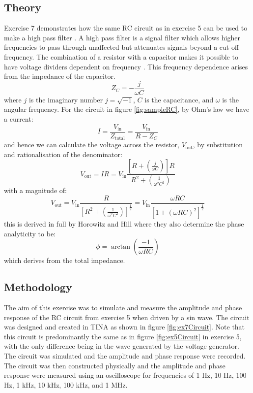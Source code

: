 \documentclass[%
reprint,
amsmath,amssymb,
aps,
floatfix
]{revtex4-2}
\begin{document}
		\subsection{Theory}
		Exercise 7 demonstrates how the same RC circuit as in exercise 5 can be used to make a high pass filter \cite{manual}. A high pass filter is a signal filter which allows higher frequencies to pass through unaffected but attenuates signals beyond a cut-off frequency. The combination of a resistor with a capacitor makes it possible to have voltage dividers dependent on frequency \cite{horowitz}. This frequency dependence arises from the impedance of the capacitor.
		\begin{equation}
			Z_C = -\frac{j}{\omega C}
		\end{equation}where $j$ is the imaginary number $j=\sqrt{-1}$, $C$ is the capacitance, and $\omega$ is the angular frequency. For the circuit in figure \ref{fig:sampleRC}, by Ohm's law we have a current:
		\begin{equation}
			I = \frac{V_\text{in}}{Z_\text{total}} = \frac{V_\text{in}}{R - Z_C}
		\end{equation}and hence we can calculate the voltage across the resistor, $V_\text{out}$, by substitution and rationalisation of the denominator:
		\begin{equation}
			V_\text{out} = I R = V_\text{in}\frac{[R+(\frac{j}{\omega C})]R}{R^2 + (\frac{1}{\omega^2 C^2})}
		\end{equation}with a magnitude of:
		\begin{equation}
			V_\text{out} = V_\text{in}\frac{R}{\left[R^2 + \left(\frac{1}{\omega^2 C^2}\right)\right]^\frac{1}{2}} = V_\text{in} \frac{\omega R C}{\left[1 + \left(\omega RC\right)^2\right]^\frac{1}{2}}
			\label{eq:amplitude}
		\end{equation}this is derived in full by Horowitz and Hill \cite{horowitz} where they also determine the phase analyticity to be:
		\begin{equation}
			\phi = \arctan\left(\frac{-1}{\omega RC}\right)
			\label{eq:phase}
		\end{equation}which derives from the total impedance.	
	
		\subsection{Methodology}
		The aim of this exercise was to simulate and measure the amplitude and phase response of the RC circuit from exercise 5 when driven by a sin wave. The circuit was designed and created in TINA as shown in figure \ref{fig:ex7Circuit}. Note that this circuit is predominantly the same as in figure \ref{fig:ex5Circuit} in exercise 5, with the only difference being in the wave generated by the voltage generator. The circuit was simulated and the amplitude and phase response were recorded. The circuit was then constructed physically and the amplitude and phase response were measured using an oscilloscope for frequencies of 1 Hz, 10 Hz, 100 Hz, 1 kHz, 10 kHz, 100 kHz, and 1 MHz.
		
\end{document}
